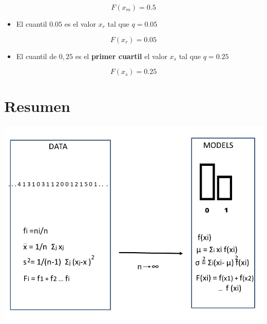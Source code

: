 \documentclass[
]{book}
\providecommand{\tightlist}{%
  \setlength{\itemsep}{0pt}\setlength{\parskip}{0pt}}
\begin{document}
\[F(x_{m})=0.5\]

\begin{itemize}
\tightlist
\item
  El cuantil \(0.05\) es el valor \(x_{r}\) tal que \(q=0.05\)
\end{itemize}

\[F(x_{r})=0.05\]

\begin{itemize}
\tightlist
\item
  El cuantil de \(0,25\) es el \textbf{primer cuartil} el valor \(x_{s}\) tal que \(q=0.25\)
\end{itemize}

\[F(x_{s})=0.25\]

\hypertarget{resumen}{%
\section{Resumen}\label{resumen}}

\includegraphics{./figures/randomvarsum.JPG}
\end{document}
